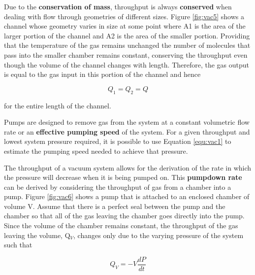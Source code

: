 Due to the {\bf conservation of mass}, throughput is always {\bf conserved} when dealing with flow through geometries of different sizes. Figure \ref{fig:vac5} shows a channel whose geometry varies in size at some point where A1 is the area of the larger portion of the channel and A2 is the area of the smaller portion. Providing that the temperature of the gas remains unchanged the number of molecules that pass into the smaller chamber remains constant, conserving the throughput even though the volume of the channel changes with length. Therefore, the gas output is equal to the gas input in this portion of the channel and hence

\begin{equation}
Q_1=Q_2=Q
\label{equ:vac2}
\end{equation}

\noindent for the entire length of the channel.

\begin{marginfigure}
\caption{}
\label{fig:vac6}
\end{marginfigure}

Pumps are designed to remove gas from the system at a constant volumetric flow rate or an {\bf effective pumping speed} of the system. For a given throughput and lowest system pressure required, it is possible to use Equation \ref{equ:vac1} to estimate the pumping speed needed to achieve that pressure.

The throughput of a vacuum system allows for the derivation of the rate in which the pressure will decrease when it is being pumped on. This {\bf pumpdown rate} can be derived by considering the throughput of gas from a chamber into a pump. Figure \ref{fig:vac6} shows a pump that is attached to an enclosed chamber of volume V. Assume that there is a perfect seal between the pump and the chamber so that all of the gas leaving the chamber goes directly into the pump. Since the volume of the chamber remains constant, the throughput of the gas leaving the volume, Q$_V$, changes only due to the varying pressure of the system such that 

\begin{equation}
Q_V=-V\dfrac{dP}{dt}
\label{equ:vac3}
\end{equation}

